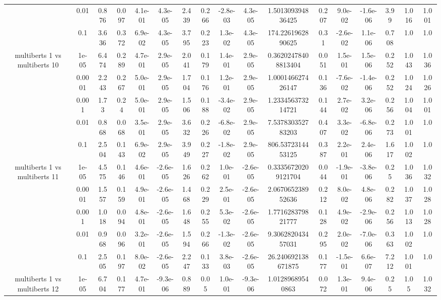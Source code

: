 \begin{tabular}{|c|c|c|c|c|c|c|c|c|c|c|c|c|c|c|c|c|}
 & 0.01 & 0.876 & 0.097 & 4.1e-01 & 4.3e-05 & 2.439 & 0.266 & -2.8e-03 & 4.3e-05 & 1.501309394836425 & 0.207 & 9.0e-02 & -1.6e-06 & 3.99 & 1.016 & 1.001 \\
 & 0.1 & 3.636 & 0.372 & 6.9e-02 & 4.3e-05 & 3.795 & 0.223 & 1.3e-02 & 4.3e-05 & 174.2261962890625 & 0.31 & -2.6e-02 & 1.1e-06 & 0.708 & 1.0 & 1.0 \\
\hline
\multirow{5}{*}{multiberts 1 vs multiberts 10} & 1e-05 & 6.474 & 0.289 & 4.7e-01 & 2.9e-05 & 2.041 & 0.179 & 1.4e-01 & 2.9e-05 & 0.36202478408813404 & 0.051 & 1.5e-01 & 1.5e-06 & 0.252 & 1.043 & 1.036 \\
 & 0.0001 & 2.243 & 0.267 & 5.0e-01 & 2.9e-05 & 1.704 & 0.176 & 1.2e-01 & 2.9e-05 & 1.000146627426147 & 0.136 & -7.6e-02 & -1.4e-06 & 0.252 & 1.024 & 1.026 \\
 & 0.001 & 1.73 & 0.24 & 5.0e-01 & 2.9e-05 & 1.506 & 0.188 & -3.4e-02 & 2.9e-05 & 1.233456373214721 & 0.144 & 2.7e-02 & 3.2e-06 & 0.256 & 1.004 & 1.001 \\
 & 0.01 & 0.868 & 0.068 & 3.5e-01 & 2.9e-05 & 3.632 & 0.226 & -6.8e-02 & 2.9e-05 & 7.537830352783203 & 0.407 & 3.3e-02 & -6.8e-06 & 0.273 & 1.001 & 1.0 \\
 & 0.1 & 2.504 & 0.143 & 6.9e-02 & 2.9e-05 & 3.949 & 0.227 & -1.8e-02 & 2.9e-05 & 806.5372314453125 & 0.387 & 2.2e-01 & 2.4e-06 & 1.617 & 1.002 & 1.0 \\
\hline
\multirow{5}{*}{multiberts 1 vs multiberts 11} & 1e-05 & 4.575 & 0.146 & 4.6e-01 & -2.6e-05 & 1.626 & 0.262 & 1.0e-01 & -2.6e-05 & 0.33356720209121704 & 0.044 & -1.9e-01 & -3.8e-06 & 0.25 & 1.036 & 1.032 \\
 & 0.0001 & 1.557 & 0.159 & 4.9e-01 & -2.6e-05 & 1.468 & 0.229 & 2.5e-01 & -2.6e-05 & 2.067065238952636 & 0.212 & 8.0e-02 & 4.8e-06 & 0.282 & 1.037 & 1.028 \\
 & 0.001 & 1.018 & 0.094 & 4.8e-01 & -2.6e-05 & 1.648 & 0.255 & 5.3e-02 & -2.6e-05 & 1.771628379821777 & 0.128 & 4.9e-02 & -2.9e-06 & 0.256 & 1.013 & 1.028 \\
 & 0.01 & 0.968 & 0.096 & 3.2e-01 & -2.6e-05 & 1.594 & 0.266 & -1.3e-02 & -2.6e-05 & 9.306282043457031 & 0.295 & 2.0e-02 & -7.0e-06 & 0.363 & 1.002 & 1.0 \\
 & 0.1 & 2.505 & 0.197 & 8.0e-02 & -2.6e-05 & 2.247 & 0.133 & 3.8e-03 & -2.6e-05 & 26.240692138671875 & 0.177 & -1.5e-01 & 6.6e-07 & 7.212 & 1.001 & 1.0 \\
\hline
\multirow{5}{*}{multiberts 1 vs multiberts 12} & 1e-05 & 6.704 & 0.177 & 4.7e-01 & -9.3e-06 & 0.889 & 0.05 & 1.0e-01 & -9.3e-06 & 1.01289689540863 & 0.072 & 1.3e-01 & 9.4e-06 & 0.25 & 1.05 & 1.032 \\

\end{tabular}
